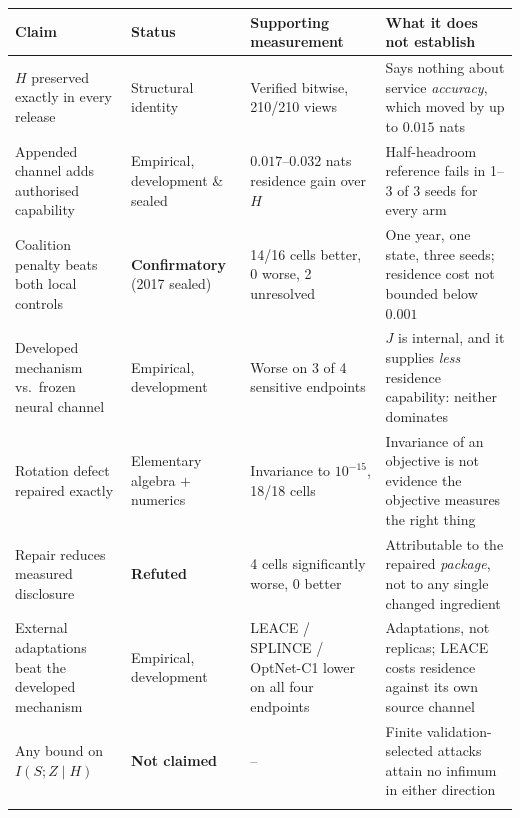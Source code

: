 \begin{tabular}{@{}p{4.0cm}p{2.5cm}p{3.7cm}p{4.9cm}@{}}
\toprule
Claim & Status & Supporting measurement & What it does not establish \\
\midrule
$H$ preserved exactly in every release & Structural identity & Verified bitwise, 210/210 views & Says nothing about service \emph{accuracy}, which moved by up to $0.015$ nats \\
\addlinespace[1.5pt]
Appended channel adds authorised capability & Empirical, development \& sealed & $0.017$--$0.032$ nats residence gain over $H$ & Half-headroom reference fails in 1--3 of 3 seeds for every arm \\
\addlinespace[1.5pt]
Coalition penalty beats both local controls & \textbf{Confirmatory} (2017 sealed) & 14/16 cells better, 0 worse, 2 unresolved & One year, one state, three seeds; residence cost not bounded below $0.001$ \\
\addlinespace[1.5pt]
Developed mechanism vs.\ frozen neural channel & Empirical, development & Worse on 3 of 4 sensitive endpoints & $J$ is internal, and it supplies \emph{less} residence capability: neither dominates \\
\addlinespace[1.5pt]
Rotation defect repaired exactly & Elementary algebra $+$ numerics & Invariance to $10^{-15}$, 18/18 cells & Invariance of an objective is not evidence the objective measures the right thing \\
\addlinespace[1.5pt]
Repair reduces measured disclosure & \textbf{Refuted} & 4 cells significantly worse, 0 better & Attributable to the repaired \emph{package}, not to any single changed ingredient \\
\addlinespace[1.5pt]
External adaptations beat the developed mechanism & Empirical, development & LEACE / SPLINCE / OptNet-C1 lower on all four endpoints & Adaptations, not replicas; LEACE costs residence against its own source channel \\
\addlinespace[1.5pt]
Any bound on $I(S;Z\mid H)$ & \textbf{Not claimed} & -- & Finite validation-selected attacks attain no infimum in either direction \\
\addlinespace[1.5pt]
\bottomrule
\end{tabular}
